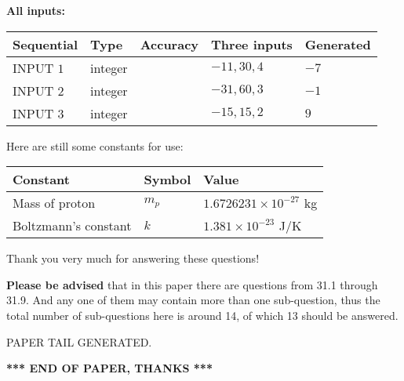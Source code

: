 \documentclass[12pt]{article}
\begin{document}
   
   
   
\noindent\vspace{0.1in}\hspace{-0.08in} {\textbf{\Large{All inputs: }}}
   
   
  
  
\noindent\begin{tabular}{|l|l|l|l|l|}
\hline
 Sequential & Type & Accuracy & Three inputs & Generated \\ 
\hline
 
 
  INPUT $           1$ & integer &  & $
 -11
 , 
 30
 , 
 4
 $ & $ -7 $ 
 \\  \hline  
 
 
  INPUT $           2$ & integer &  & $
 -31
 , 
 60
 , 
 3
 $ & $ -1 $ 
 \\  \hline  
 
 
  INPUT $           3$ & integer &  & $
 -15
 , 
 15
 , 
 2
 $ & $ 9 $ 
 \\  \hline  
 \end{tabular}
   
   
   
   
   
   
 \vspace{0.2in}
Here are still some constants for use:
 
 
\noindent\begin{tabular}{|l|l|l|}
\hline
Constant & Symbol & Value \\
\hline
 
Mass of proton &
$m_p$ &
 $ 1.6726231 \times 10^{-27} $
kg \\
\hline
 
Boltzmann's constant &
$k$ &
 $ 1.381 \times 10^{-23} $
J/K \\
\hline
 
\end{tabular}
 
Thank you very much for answering these questions!
 
{\textbf{\large{Please be advised}}} that in this paper there are questions from
31.1 through
31.9.
And any one of them may contain more than one sub-question, thus the total number
of sub-questions here is around 14, of which
13 should be answered.
 
   
   
\vspace{2.0in} PAPER TAIL GENERATED.
   
   
   
   
\vspace{1.0in} 
{\textbf{\large{ *** END OF PAPER, THANKS *** }}} 
   
\end{document}
